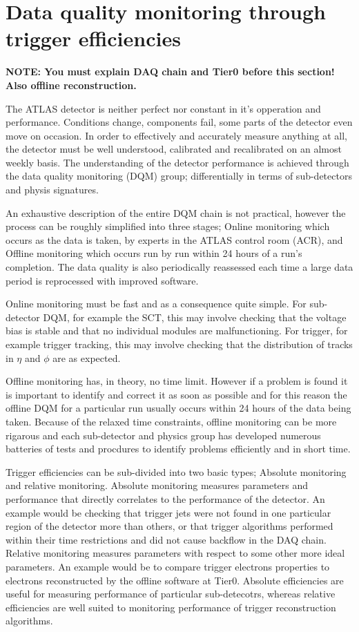 \chapter{Data quality monitoring through trigger efficiencies }

\textbf{NOTE: You must explain DAQ chain and Tier0 before this section! Also offline reconstruction.}

The ATLAS detector is neither perfect nor constant in it's opperation and performance. Conditions change, components fail, some parts of the detector even move on occasion. In order to effectively and accurately measure anything at all, the detector must be well understood, calibrated and recalibrated on an almost weekly basis. The understanding of the detector performance is achieved through the data quality monitoring (DQM) group; differentially in terms of sub-detectors and physis signatures. 

An exhaustive description of the entire DQM chain is not practical, however the process can be roughly simplified into three stages; Online monitoring which occurs as the data is taken, by experts in the ATLAS control room (ACR), and Offline monitoring which occurs run by run within 24 hours of a run's completion. The data quality is also periodically reassessed each time a large data period is reprocessed with improved software. 

Online monitoring must be fast and as a consequence quite simple. For sub-detector DQM, for example the SCT, this may involve checking that the voltage bias is stable and that no individual modules are malfunctioning. For trigger, for example trigger tracking, this may involve checking that the distribution of tracks in $\eta$ and $\phi$ are as expected. 

Offline monitoring has, in theory, no time limit. However if a problem is found it is important to identify and correct it as soon as possible and for this reason the offline DQM for a particular run usually occurs within 24 hours of the data being taken. Because of the relaxed time constraints, offline monitoring can be more rigarous and each sub-detector and physics group has developed numerous batteries of tests and procdures to identify problems efficiently and in short time.

Trigger efficiencies can be sub-divided into two basic types; Absolute monitoring and relative monitoring. Absolute monitoring measures parameters and performance that directly correlates to the performance of the detector. An example would be checking that trigger jets were not found in one particular region of the detector more than others, or that trigger algorithms performed within their time restrictions and did not cause backflow in the DAQ chain. Relative monitoring measures parameters with respect to some other more ideal parameters. An example would be to compare trigger electrons properties to electrons reconstructed by the offline software at Tier0. Absolute efficiencies are useful for measuring performance of particular sub-detecotrs, whereas relative efficiencies are well suited to monitoring performance of trigger reconstruction algorithms.

